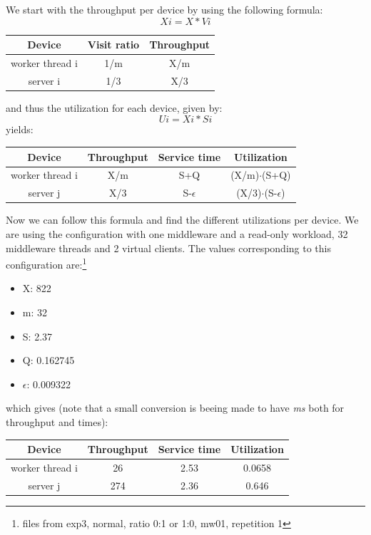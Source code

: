 \documentclass[11pt,a4paper]{article}
\begin{document}
We start with the throughput per device by using the following formula: 
\[Xi = X*Vi\]
 \begin{center}

		\begin{tabular}{|c|c|c|}
			  \hline
			  \textbf{Device} & \textbf{Visit ratio} & \textbf{Throughput} \\
			  \hline
			  worker thread i  & 1/m & X/m \\
			  server i & 1/3 & X/3   \\
			  \hline
		\end{tabular}
 \end{center}
and thus the utilization for each device, given by:
\[Ui = Xi*Si\]
yields:
  \begin{center}

		\begin{tabular}{|c|c|c|c|}
			  \hline
			  \textbf{Device} & \textbf{Throughput} & \textbf{Service time} & \textbf{Utilization} \\
			  \hline
			  worker thread i  &X/m  & S+Q  &(X/m)$\cdot$(S+Q)\\
			  server j & X/3 & S-\(\epsilon \) &(X/3)$\cdot$(S-\(\epsilon \))  \\
			  \hline
		\end{tabular}
 \end{center}
Now we can follow this formula and find the different utilizations per device. We are using the configuration with one middleware and a read-only workload, 32 middleware threads and 2 virtual clients. The values corresponding to this configuration are:\footnote{files from exp3, normal, ratio 0:1 or 1:0, mw01, repetition 1} 
\begin{itemize}
\item X: 822
\item m: 32
\item S: 2.37
\item Q: 0.162745
\item \(\epsilon \): 0.009322
\end{itemize}
which gives (note that a small conversion is beeing made to have \textit{ms} both for throughput and times):
  \begin{center}
		\begin{tabular}{|c|c|c|c|}
			  \hline
			  \textbf{Device} & \textbf{Throughput} & \textbf{Service time} & \textbf{Utilization} \\
			  \hline
			  worker thread i  &26  & 2.53  &0.0658\\
			  server j & 274 & 2.36 &0.646  \\
			  \hline
		\end{tabular}
 \end{center}
\end{document}
